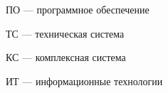 

\hypertarget{soft}{ПО --- программное обеспечение}















\hypertarget{it}{ТС --- техническая система}

\hypertarget{it}{КС --- комплексная система}

\hypertarget{it}{ИТ --- информационные технологии}






